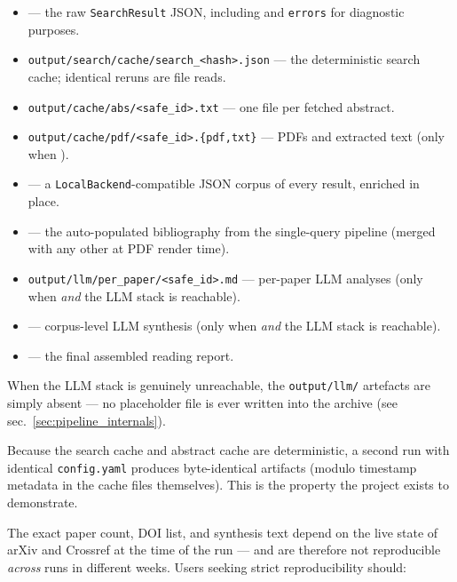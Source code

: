 \documentclass[
]{article}
\providecommand{\tightlist}{%
  \setlength{\itemsep}{0pt}\setlength{\parskip}{0pt}}
\begin{document}
\begin{itemize}
\tightlist
\item
   --- the raw \texttt{SearchResult}
  JSON, including  and \texttt{errors} for
  diagnostic purposes.
\item
  \texttt{output/search/cache/search\_\textless{}hash\textgreater{}.json}
  --- the deterministic search cache; identical reruns are file reads.
\item
  \texttt{output/cache/abs/\textless{}safe\_id\textgreater{}.txt} ---
  one file per fetched abstract.
\item
  \texttt{output/cache/pdf/\textless{}safe\_id\textgreater{}.\{pdf,txt\}}
  --- PDFs and extracted text (only when
  ).
\item
   --- a \texttt{LocalBackend}-compatible
  JSON corpus of every result, enriched in place.
\item
   --- the auto-populated bibliography
  from the single-query pipeline (merged with any other
   at PDF render time).
\item
  \texttt{output/llm/per\_paper/\textless{}safe\_id\textgreater{}.md}
  --- per-paper LLM analyses (only when 
  \emph{and} the LLM stack is reachable).
\item
   --- corpus-level LLM synthesis (only
  when  \emph{and} the LLM stack is
  reachable).
\item
   --- the final assembled reading
  report.
\end{itemize}

When the LLM stack is genuinely unreachable, the \texttt{output/llm/}
artefacts are simply absent --- no placeholder file is ever written into
the archive (see sec.~\ref{sec:pipeline_internals}).

Because the search cache and abstract cache are deterministic, a second
run with identical \texttt{config.yaml} produces byte-identical
artifacts (modulo timestamp metadata in the cache files themselves).
This is the property the project exists to demonstrate.

The exact paper count, DOI list, and synthesis text depend on the live
state of arXiv and Crossref at the time of the run --- and are therefore
not reproducible \emph{across} runs in different weeks. Users seeking
strict reproducibility should:
\end{document}
